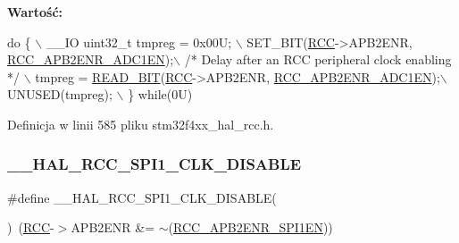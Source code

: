 {\bfseries Wartość\+:}
\begin{DoxyCode}
\textcolor{keywordflow}{do} \{ \(\backslash\)
                                        \_\_IO uint32\_t tmpreg = 0x00U; \(\backslash\)
                                        SET\_BIT(\hyperlink{group___peripheral__declaration_ga74944438a086975793d26ae48d5882d4}{RCC}->APB2ENR, 
      \hyperlink{group___peripheral___registers___bits___definition_ga57b9f50cb96a2e4ceba37728b4a32a42}{RCC\_APB2ENR\_ADC1EN});\(\backslash\)
                                        \textcolor{comment}{/* Delay after an RCC peripheral clock enabling */} \(\backslash\)
                                        tmpreg = \hyperlink{group___exported__macro_ga822bb1bb9710d5f2fa6396b84e583c33}{READ\_BIT}(\hyperlink{group___peripheral__declaration_ga74944438a086975793d26ae48d5882d4}{RCC}->APB2ENR, 
      \hyperlink{group___peripheral___registers___bits___definition_ga57b9f50cb96a2e4ceba37728b4a32a42}{RCC\_APB2ENR\_ADC1EN});\(\backslash\)
                                        UNUSED(tmpreg); \(\backslash\)
                                          \} \textcolor{keywordflow}{while}(0U)
\end{DoxyCode}


Definicja w linii 585 pliku stm32f4xx\+\_\+hal\+\_\+rcc.\+h.

\mbox{\label{group___r_c_c___a_p_b2___clock___enable___disable_gaf2ccb5c6b63a60deb6463cbc629c10fe}} 
\subsubsection{\texorpdfstring{\+\_\+\+\_\+\+H\+A\+L\+\_\+\+R\+C\+C\+\_\+\+S\+P\+I1\+\_\+\+C\+L\+K\+\_\+\+D\+I\+S\+A\+B\+LE}{\_\_HAL\_RCC\_SPI1\_CLK\_DISABLE}}
{\footnotesize\ttfamily \#define \+\_\+\+\_\+\+H\+A\+L\+\_\+\+R\+C\+C\+\_\+\+S\+P\+I1\+\_\+\+C\+L\+K\+\_\+\+D\+I\+S\+A\+B\+LE(\begin{DoxyParamCaption}{ }\end{DoxyParamCaption})~(\hyperlink{group___peripheral__declaration_ga74944438a086975793d26ae48d5882d4}{R\+CC}-\/$>$A\+P\+B2\+E\+NR \&= $\sim$(\hyperlink{group___peripheral___registers___bits___definition_gae08a3510371b9234eb96369c91d3552f}{R\+C\+C\+\_\+\+A\+P\+B2\+E\+N\+R\+\_\+\+S\+P\+I1\+EN}))}



